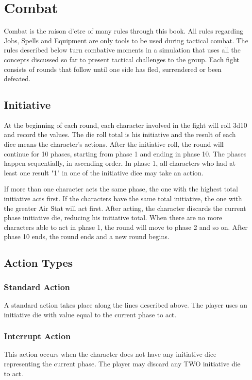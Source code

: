 \section{Combat}
\label{sec:combat}
\begin{multicols}{2}
Combat is the raison d’etre of many rules
through this book. All rules regarding Jobs, Spells
and Equipment are only tools to be used during
tactical combat. The rules described below turn
combative moments in a simulation that uses all
the concepts discussed so far to present tactical
challenges to the group. Each fight consists of
rounds that follow until one side has fled,
surrendered or been defeated.

\subsection{Initiative}
\label{subsec:init}
At the beginning of each round, each
character involved in the fight will roll 3d10 and
record the values. The die roll total is his initiative
and the result of each dice means the character's
actions. After the initiative roll, the round will
continue for 10 phases, starting from phase 1 and
ending in phase 10. The phases happen
sequentially, in ascending order. In phase 1, all
characters who had at least one result "1" in one of
the initiative dice may take an action.

If more than one character acts the same
phase, the one with the highest total initiative acts
first. If the characters have the same total initiative,
the one with the greater Air Stat will act first. After
acting, the character discards the current phase
initiative die, reducing his initiative total. When
there are no more characters able to act in phase 1,
the round will move to phase 2 and so on. After
phase 10 ends, the round ends and a new round
begins.
\subsection{Action Types}
\label{subsec:actions}
\subsubsection{Standard Action}
A standard action takes place along the
lines described above. The player uses an initiative
die with value equal to the current phase to act.

\subsubsection{Interrupt Action}
This action occurs when the character
does not have any initiative dice representing the
current phase. The player may discard any TWO
initiative die to act.


\end{multicols}
